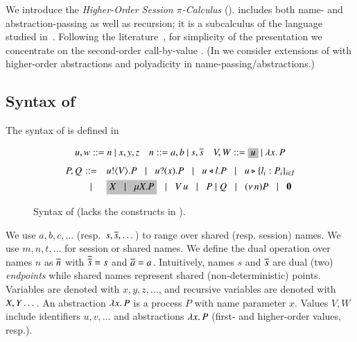 \noindent 
We introduce the 
\emph{Higher-Order Session $\pi$-Calculus} (\HOp).
\HOp includes both name- and abstraction-passing 
as well as recursion; it is a subcalculus 
of the language
studied 
in~\cite{tlca07}. 
Following the literature~\cite{JeffreyR05},
for simplicity of the presentation
we concentrate on the second-order call-by-value \HOp.  
(In  we consider extensions of 
\HOp with higher-order abstractions 
and polyadicity in name-passing/abstractions.)


\subsection{Syntax of \HOp}
\label{subsec:syntax}
\noindent{} The syntax of \HOp is defined in 
\begin{figure}[t]
\[ 
\begin{array}{lll}
u,w  ::=  n \ | \ x,y,z
& n ::= a,b  \ | \ s, \dual{s} 
& V,W  ::=   \nonhosyntax{u} \ | \ \abs{x}{P}
\end{array}
\]
\[
\begin{array}{rclllll}
P,Q \!\!\!\!\!\! & ::= & \!\! \bout{u}{V}{P}  \bnfbar  \binp{u}{x}{P} \bnfbar
 \bsel{u}{l} P \bnfbar \bbra{u}{l_i:P_i}_{i \in I}   \\[1mm]
 & \bnfbar & \!\!  \nonhosyntax{\rvar{X} \bnfbar \recp{X}{P}} \bnfbar \appl{V}{u} \bnfbar P\Par Q \bnfbar \news{n} P 
\bnfbar 

 \inact
\end{array}
\]
 \caption{Syntax of \HOp (\HO lacks the constructs in ).}
\label{fig:syntax}
\Hlinefig
\end{figure}
We use $a,b,c, \dots$ (resp.~$s, \overline{s}, \dots$) 
to range over shared (resp. session) names. 
We use $m, n, t, \dots$ for session or shared names. 
We define the dual operation over names $n$ as $\overline{n}$ with
$\overline{\overline{s}} = s$ and $\overline{a} = a$.
Intuitively, names $s$ and $\overline{s}$ are dual (two) \emph{endpoints} while 
shared names represent shared (non-deterministic) points. 
Variables are denoted with $x, y, z, \dots$, 
and recursive variables are denoted with $X, Y \dots$.
An abstraction %
$\lambda x.\,P$ is a process $P$ with name parameter $x$.
Values $V,W$ include 
identifiers $u, v, \ldots$ %
and 
abstractions $\lambda x.\,P$ (first- and higher-order values, resp.). 

